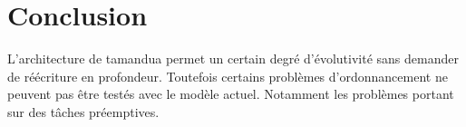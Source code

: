\chapter{Conclusion}
L'architecture de tamandua permet un certain degré d'évolutivité sans demander
de réécriture en profondeur. Toutefois certains problèmes d'ordonnancement ne
peuvent pas être testés avec le modèle actuel. Notamment les problèmes portant sur
des tâches préemptives. 

